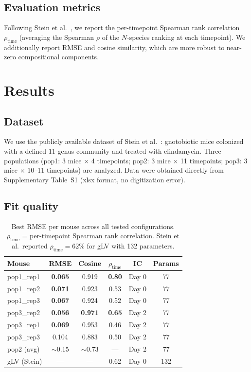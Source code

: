 \documentclass[10pt,a4paper]{article}
\begin{document}
\subsection{Evaluation metrics}

Following Stein et al.\ \cite{stein2013}, we report the per-timepoint
Spearman rank correlation $\rho_{\mathrm{time}}$ (averaging the Spearman
$\rho$ of the $N$-species ranking at each timepoint). We additionally
report RMSE and cosine similarity, which are more robust to near-zero
compositional components.

\section{Results}

\subsection{Dataset}

We use the publicly available dataset of Stein et al.\ \cite{stein2013}:
gnotobiotic mice colonized with a defined 11-genus community and treated
with clindamycin. Three populations (pop1: 3 mice $\times$ 4 timepoints;
pop2: 3 mice $\times$ 11 timepoints; pop3: 3 mice $\times$ 10--11
timepoints) are analyzed. Data were obtained directly from Supplementary
Table~S1 (xlsx format, no digitization error).

\subsection{Fit quality}

\begin{table}[H]\centering
\caption{Best RMSE per mouse across all tested configurations.
$\rho_{\mathrm{time}}$ = per-timepoint Spearman rank correlation.
Stein et al.\ reported $\rho_{\mathrm{time}} = 62\%$ for gLV with
132 parameters.}
\label{tab:results}
\begin{tabular}{lccccc}
\toprule
Mouse & RMSE & Cosine & $\rho_{\mathrm{time}}$ & IC & Params \\
\midrule
pop1\_rep1 & \textbf{0.065} & 0.919 & \textbf{0.80} & Day 0 & 77 \\
pop1\_rep2 & \textbf{0.071} & 0.923 & 0.53 & Day 0 & 77 \\
pop1\_rep3 & \textbf{0.067} & 0.924 & 0.52 & Day 0 & 77 \\
pop3\_rep2 & \textbf{0.056} & \textbf{0.971} & \textbf{0.65} & Day 2 & 77 \\
pop3\_rep1 & \textbf{0.069} & 0.953 & 0.46 & Day 2 & 77 \\
pop3\_rep3 & 0.104 & 0.883 & 0.50 & Day 2 & 77 \\
pop2 (avg) & $\sim$0.15 & $\sim$0.73 & --- & Day 2 & 77 \\
\midrule
gLV (Stein) & --- & --- & 0.62 & Day 0 & 132 \\
\bottomrule
\end{tabular}
\end{table}
\end{document}
